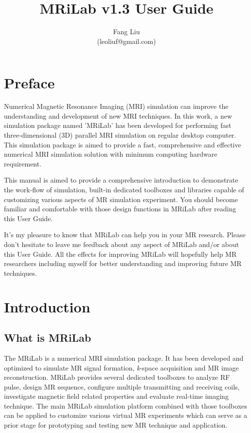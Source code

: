 \documentclass{book}%
\begin{document}
\frontmatter
\title{MRiLab v1.3 User Guide}
\author{Fang Liu \\ (leoliuf@gmail.com)}
\maketitle
\tableofcontents
\chapter*{Preface}

Numerical Magnetic Resonance Imaging (MRI) simulation can improve the understanding and development of new MRI techniques. In this work, a new simulation package named 'MRiLab' has been developed for performing fast three-dimensional (3D) parallel MRI simulation on regular desktop computer. This simulation package is aimed to provide a fast, comprehensive and effective numerical MRI simulation solution with minimum computing hardware requirement.

This manual is aimed to provide a comprehensive introduction to demonstrate the work-flow of simulation, built-in dedicated toolboxes and libraries capable of customizing various aspects of MR simulation experiment. You should become familiar and comfortable with those design functions in MRiLab after reading this User Guide.

It's my pleasure to know that MRiLab can help you in your MR research. Please don't hesitate to leave me feedback about any aspect of MRiLab and/or about this User Guide. All the effects for improving MRiLab will hopefully help MR researchers including myself for better understanding and improving future MR techniques.

\mainmatter

\chapter{Introduction}
\section{What is MRiLab}
The MRiLab is a numerical MRI simulation package. It has been developed and optimized to simulate MR signal formation, \textit{k}-space acquisition and MR image reconstruction. MRiLab provides several dedicated toolboxes to analyze RF pulse, design MR sequence, configure multiple transmitting and receiving coils, investigate magnetic field related properties and evaluate real-time imaging technique. The main MRiLab simulation platform combined with those toolboxes can be applied to customize various virtual MR experiments which can serve as a prior stage for prototyping and testing new MR technique and application.
\end{document}
